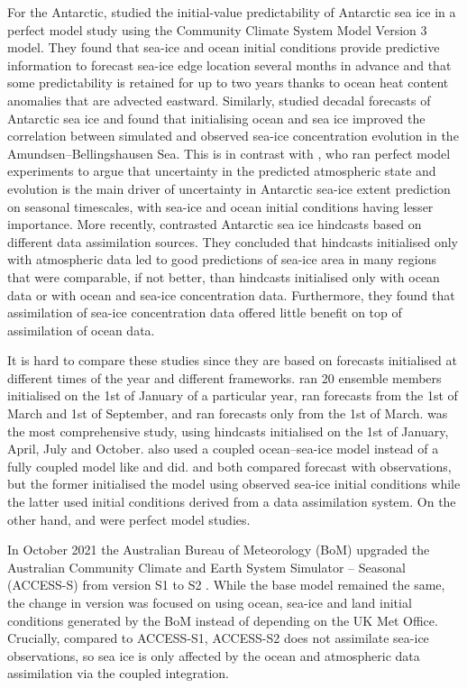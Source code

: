 \documentclass[tc, manuscript]{copernicus}
\begin{document}
For the Antarctic, \citet{holland2013} studied the initial-value
predictability of Antarctic sea ice in a perfect model study using the
Community Climate System Model Version 3 model. They found that sea-ice
and ocean initial conditions provide predictive information to forecast
sea-ice edge location several months in advance and that some
predictability is retained for up to two years thanks to ocean heat
content anomalies that are advected eastward. Similarly,
\citet{morioka2022} studied decadal forecasts of Antarctic sea ice and
found that initialising ocean and sea ice improved the correlation
between simulated and observed sea-ice concentration evolution in the
Amundsen--Bellingshausen Sea. This is in contrast with
\citet{marchi2020}, who ran perfect model experiments to argue that
uncertainty in the predicted atmospheric state and evolution is the main
driver of uncertainty in Antarctic sea-ice extent prediction on seasonal
timescales, with sea-ice and ocean initial conditions having lesser
importance. More recently, \citet{xiu2025} contrasted Antarctic sea ice
hindcasts based on different data assimilation sources. They concluded
that hindcasts initialised only with atmospheric data led to good
predictions of sea-ice area in many regions that were comparable, if not
better, than hindcasts initialised only with ocean data or with ocean
and sea-ice concentration data. Furthermore, they found that
assimilation of sea-ice concentration data offered little benefit on top
of assimilation of ocean data.

It is hard to compare these studies since they are based on forecasts
initialised at different times of the year and different frameworks.
\citet{holland2013} ran 20 ensemble members initialised on the 1st of
January of a particular year, \citet{marchi2020} ran forecasts from the
1st of March and 1st of September, and \citet{morioka2022} ran forecasts
only from the 1st of March. \citet{xiu2025} was the most comprehensive
study, using hindcasts initialised on the 1st of January, April, July
and October. \citet{marchi2020} also used a coupled ocean--sea-ice model
instead of a fully coupled model like \citet{holland2013} and
\citet{xiu2025} did. \citet{morioka2022} and \citet{xiu2025} both
compared forecast with observations, but the former initialised the
model using observed sea-ice initial conditions while the latter used
initial conditions derived from a data assimilation system. On the other
hand, \citet{marchi2020} and \citet{holland2013} were perfect model
studies.

In October 2021 the Australian Bureau of Meteorology (BoM) upgraded the
Australian Community Climate and Earth System Simulator -- Seasonal
(ACCESS-S) from version S1 to S2 \citep{wedd2022}. While the base model
remained the same, the change in version was focused on using ocean,
sea-ice and land initial conditions generated by the BoM instead of
depending on the UK Met Office. Crucially, compared to ACCESS-S1,
ACCESS-S2 does not assimilate sea-ice observations, so sea ice is only
affected by the ocean and atmospheric data assimilation via the coupled
integration.
\end{document}
